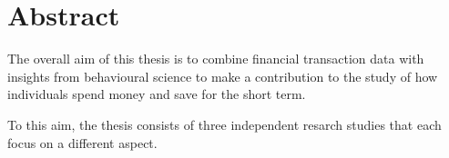 
\chapter*{Abstract}%
\label{cha:abstract}


The overall aim of this thesis is to combine financial transaction data with
insights from behavioural science to make a contribution to the study of how
individuals spend money and save for the short term.

To this aim, the thesis consists of three independent resarch studies that each
focus on a different aspect.


